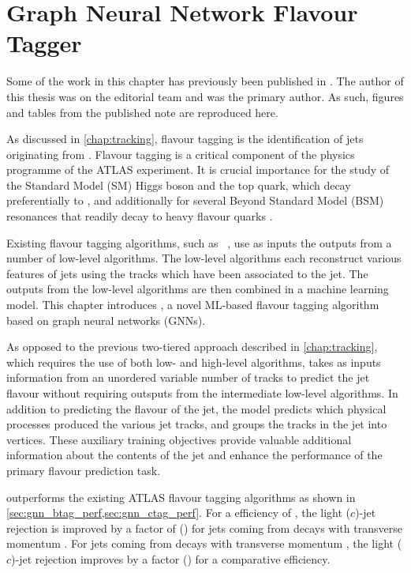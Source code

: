 \chapter{Graph Neural Network Flavour Tagger}\label{chap:gnn_tagger}

Some of the work in this chapter has previously been published in .
The author of this thesis was on the editorial team and was the primary author.
As such, figures and tables from the published note are reproduced here.

As discussed in \cref{chap:tracking}, flavour tagging is the identification of jets originating from \bcquarks.
Flavour tagging is a critical component of the physics programme of the ATLAS experiment. 
It is crucial importance for the study of the Standard Model (SM) Higgs boson and the top quark, which decay preferentially to \bquarks \cite{HIGG-2018-04,HIGG-2018-13}, and additionally for several Beyond Standard Model (BSM) resonances that readily decay to heavy flavour quarks \cite{EXOT-2019-03}.

Existing flavour tagging algorithms, such as \DLr~\cite{ATL-PHYS-PUB-2017-013,ATLAS:2022qxm}, use as inputs the outputs from a number of low-level algorithms.
The low-level algorithms each reconstruct various features of jets using the tracks which have been associated to the jet.
The outputs from the low-level algorithms are then combined in a machine learning model.
This chapter introduces \GNN, a novel ML-based flavour tagging algorithm based on graph neural networks (GNNs).

As opposed to the previous two-tiered approach described in \cref{chap:tracking}, which requires the use of both low- and high-level algorithms,
\GNN takes as inputs information from an unordered variable number of tracks to predict the jet flavour without requiring outsputs from the intermediate low-level algorithms.
In addition to predicting the flavour of the jet, the model predicts which physical processes produced the various jet tracks, and groups the tracks in the jet into vertices.
These auxiliary training objectives provide valuable additional information about the contents of the jet and enhance the performance of the primary flavour prediction task.

\GNN outperforms the existing ATLAS flavour tagging algorithms as shown in \cref{sec:gnn_btag_perf,sec:gnn_ctag_perf}.
For a \bjet efficiency of , the light ($c$)-jet rejection is improved by a factor of \ttbllo (\ttbclo) for jets coming from \ttbar decays with transverse momentum \ttbarpt.
For jets coming from \Zprime decays with transverse momentum \Zprimept, the light ($c$)-jet rejection improves by a factor \zpbllo (\zpbclo) for a comparative  \bjet efficiency.

